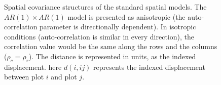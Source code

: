 \begin{figure}[hbtp]
	\caption[Spatial covariance structures of the standard spatial models]{Spatial covariance structures of the standard spatial models. The $AR(1)\times AR(1)$ model is presented as anisotropic (the auto-correlation parameter is directionally dependent). In isotropic conditions (auto-correlation is similar in every direction), the correlation value would be the same along the rows and the columns ($\rho_{c} = \rho_{r}$). The distance is represented in units, as the indexed displacement. here $d(i,ij)$ represents the indexed displacement between plot $i$ and plot $j$.}
	\label{fig:Spatial_cov_structure}
\end{figure}
